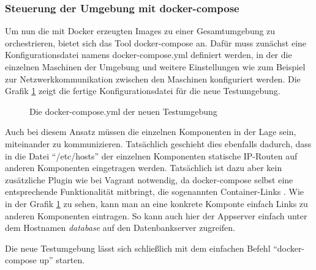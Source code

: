 \subsubsection{Steuerung der Umgebung mit docker-compose}

Um nun die mit Docker erzeugten Images zu einer Gesamtumgebung zu orchestrieren, bietet sich das Tool docker-compose \citep[Vgl.][]{dockercompose} an. Dafür muss zunächst eine Konfigurationsdatei namens docker-compose.yml definiert werden, in der die einzelnen Maschinen der Umgebung und weitere Einstellungen wie zum Beispiel zur Netzwerkkommunikation zwischen den Maschinen konfiguriert werden. Die Grafik \ref{dockercomposeyml} zeigt die fertige Konfigurationsdatei für die neue Testumgebung.

\begin{figure}[!ht]
  \begin{center}
    \caption{Die docker-compose.yml der neuen Testumgebung}
    \label{dockercomposeyml}
  \end{center}
\end{figure}

Auch bei diesem Ansatz müssen die einzelnen Komponenten in der Lage sein, miteinander zu kommunizieren. Tatsächlich geschieht dies ebenfalls dadurch, dass in die Datei "`/etc/hosts"' der einzelnen Komponenten statische IP-Routen auf anderen Komponenten eingetragen werden. Tatsächlich ist dazu aber kein zusätzliche Plugin wie bei Vagrant notwendig, da docker-compose selbst eine entsprechende Funktionalität mitbringt, die sogenannten Container-Links \citep[Vgl.][]{dockerlinks}. Wie in der Grafik \ref{dockercomposeyml} zu sehen, kann man an eine konkrete Komponte einfach Links zu anderen Komponenten eintragen. So kann auch hier der Appserver einfach unter dem Hostnamen \textit{database} auf den Datenbankserver zugreifen.

Die neue Testumgebung lässt sich schließlich mit dem einfachen Befehl "`docker-compose up"' starten.


